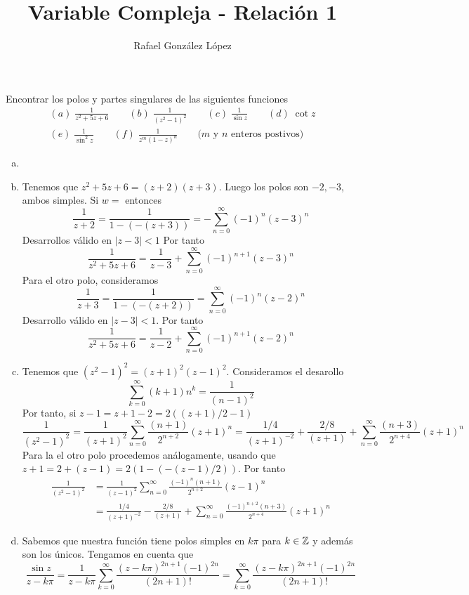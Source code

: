 \documentclass[twoside]{article}
\begin{document}
\title{Variable Compleja - Relación 1}
\author{Rafael González López}
\maketitle
\begin{ejercicio}{1}
Encontrar los polos y partes singulares de las siguientes funciones
\begin{gather*}
(a)\; \frac{1}{z^2+5z+6} \qquad (b)\; \frac{1}{(z^2-1)^2} \qquad (c)\; \frac{1}{\sin z} \qquad (d)\; \cot z\\
(e)\; \frac{1}{\sin^2 z}\qquad (f)\; \frac{1}{z^m(1-z)^n} \qquad\text{($m$ y $n$ enteros postivos)}
\end{gather*}
\end{ejercicio}
\begin{solucion}
\begin{enumerate}[(a)]
\item[]
\item Tenemos que $z^2+5z+6=(z+2)(z+3)$. Luego los polos son $-2,-3$, ambos simples. Si $w=$ entonces
$$
\frac{1}{z+2}=\frac{1}{1-(-(z+3))} = - \sum_{n=0}^\infty (-1)^n(z-3)^n
$$
Desarrollos válido en $|z-3|<1$ Por tanto
$$
\frac{1}{z^2+5z+6} = \frac{1}{z-3} + \sum_{n=0}^\infty (-1)^{n+1}(z-3)^n
$$
Para el otro polo, consideramos
$$
\frac{1}{z+3} = \frac{1}{1-(-(z+2))} = \sum_{n=0}^\infty (-1)^n(z-2)^n
$$
Desarrollo válido en $|z-3|<1$. Por tanto
$$
\frac{1}{z^2+5z+6} = \frac{1}{z-2} + \sum_{n=0}^\infty (-1)^{n+1}(z-2)^n
$$
\newpage
\item Tenemos que $(z^2-1)^2 = (z+1)^2(z-1)^2$. Consideramos el desarollo
$$
\sum_{k=0}^\infty (k+1)n^k = \frac{1}{(n-1)^2}
$$
Por tanto, si $z-1 = z+1 -2 = {2((z+1)/2-1)}$
$$\frac{1}{(z^2-1)^2}=  \frac{1}{(z+1)^2} \sum_{n=0}^\infty\frac{(n+1)}{2^{n+2}}(z+1)^n = \frac{1/4}{(z+1)^{-2}}+\frac{2/8}{(z+1)} + \sum_{n=0}^\infty \frac{(n+3)}{2^{n+4}}(z+1)^{n} 
$$
Para la el otro polo procedemos análogamente, usando que $z+1=2+(z-1) = 2(1-(-(z-1)/2))$. Por tanto
\begin{align*}
\frac{1}{(z^2-1)^2}&=  \frac{1}{(z-1)^2} \sum_{n=0}^\infty\frac{(-1)^n(n+1)}{2^{n+2}}(z-1)^n\\
&= \frac{1/4}{(z+1)^{-2}}-\frac{2/8}{(z+1)} + \sum_{n=0}^\infty \frac{(-1)^{n+2}(n+3)}{2^{n+4}}(z+1)^{n}
\end{align*}
\item Sabemos que nuestra función tiene polos simples en $k\pi$ para $k\in \mathbb{Z}$ y además son los únicos.
Tengamos en cuenta que
$$\frac{\sin z}{z-k\pi} = \frac{1}{z-k\pi}\sum_{k=0}^\infty \frac{(z-k\pi)^{2n+1}(-1)^{2n}}{(2n+1)!} = \sum_{k=0}^\infty \frac{(z-k\pi)^{2n+1}(-1)^{2n}}{(2n+1)!} $$

\end{enumerate}
\end{solucion}
\end{document}
